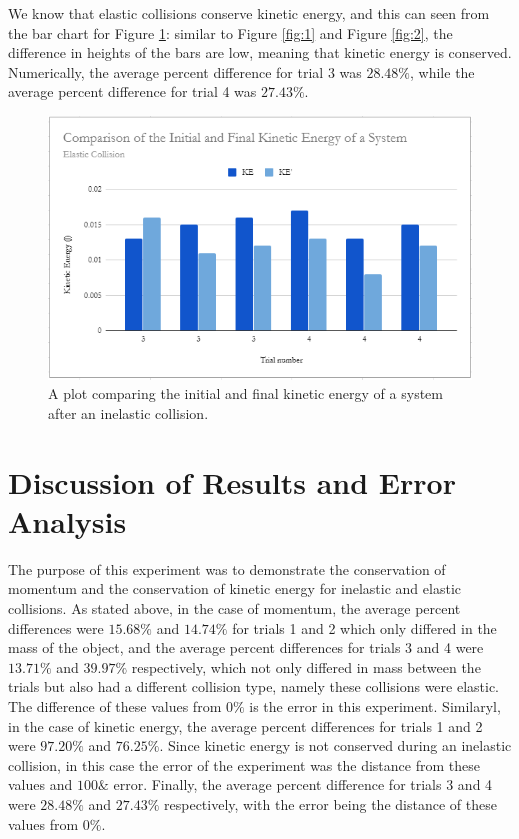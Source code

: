 \documentclass{article}
\theoremstyle{definition}
\begin{document}
We know that elastic collisions conserve kinetic energy, and this can seen
from the bar chart for Figure \ref{fig:4}: similar to Figure \ref{fig:1} and Figure \ref{fig:2}, 
the difference in heights of the bars are low, meaning that kinetic energy is conserved.
Numerically, the average percent difference for trial 3 was $28.48\%$, while the average percent difference for trial 4 was
$27.43\%$.
\begin{figure}
    \includegraphics[width = 1 \columnwidth]{fig7.PNG}
    \caption{A plot comparing the initial and final kinetic energy of a system after an inelastic collision.}
    \label{fig:4}
\end{figure}
\section{Discussion of Results and Error Analysis}
The purpose of this experiment was to demonstrate the conservation of momentum and the conservation of kinetic energy for
inelastic and elastic collisions. As stated above, in the case of momentum, the average percent differences were
$15.68\%$ and $14.74\%$ for trials 1 and 2 which only differed in the mass of the object, and the average percent differences for
trials 3 and 4 were $13.71\%$ and $39.97\%$ respectively, which not only differed in mass between the trials but also had a different collision type, 
namely these collisions were elastic. The difference of these values from $0\%$ is the error in this experiment. Similaryl, in the case of 
kinetic energy, the average percent differences for trials 1 and 2 were $97.20\%$ and $76.25\%$. Since kinetic energy is not conserved
during an inelastic collision, in this case the error of the experiment was the distance from these values and $100\&$ error. Finally, 
the average percent difference for trials 3 and 4 were $28.48\%$ and $27.43\%$ respectively, with the error being the distance of these values from $0\%$.
\end{document}
